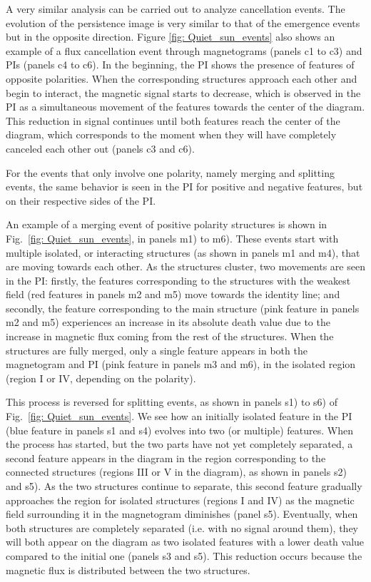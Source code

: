 A very similar analysis can be carried out to analyze cancellation events. The evolution of the persistence image is very similar to that of the emergence events but in the opposite direction. Figure \ref{fig: Quiet_sun_events} also shows an example of a flux cancellation event through magnetograms (panels c1 to c3) and PIs (panels c4 to c6). In the beginning, the PI shows the presence of features of opposite polarities. When the corresponding structures approach each other and begin to interact, the magnetic signal starts to decrease, which is observed in the PI as a simultaneous movement of the features towards the center of the diagram. This reduction in signal continues until both features reach the center of the diagram, which corresponds to the moment when they will have completely canceled each other out (panels c3 and c6). 

For the events that only involve one polarity, namely merging and splitting events, the same behavior is seen in the PI for positive and negative features, but on their respective sides of the PI.

An example of a merging event of positive polarity structures is shown in Fig.~\ref{fig: Quiet_sun_events}, in panels m1) to m6). These events start with multiple isolated, or interacting structures (as shown in panels m1 and m4), that are moving towards each other. As the structures cluster, two movements are seen in the PI: firstly, the features corresponding to the structures with the weakest field (red features in panels m2 and m5) move towards the identity line; and secondly, the feature corresponding to the main structure (pink feature in panels m2 and m5) experiences an increase in its absolute death value due to the increase in magnetic flux coming from the rest of the structures. When the structures are fully merged, only a single feature appears in both the magnetogram and PI (pink feature in panels m3 and m6), in the isolated region (region I or IV, depending on the polarity).

This process is reversed for splitting events, as shown in panels s1) to s6) of Fig.~\ref{fig: Quiet_sun_events}. We see how an initially isolated feature in the PI (blue feature in panels s1 and s4) evolves into two (or multiple) features. When the process has started, but the two parts have not yet completely separated, a second feature appears in the diagram in the region corresponding to the connected structures (regions III or V in the diagram), as shown in panels s2) and s5). As the two structures continue to separate, this second feature gradually approaches the region for isolated structures (regions I and IV)  as the magnetic field surrounding it in the magnetogram diminishes (panel s5). Eventually, when both structures are completely separated (i.e. with no signal around them), they will both appear on the diagram as two isolated features with a lower death value compared to the initial one (panels s3 and s5). This reduction occurs because the magnetic flux is distributed between the two structures.

